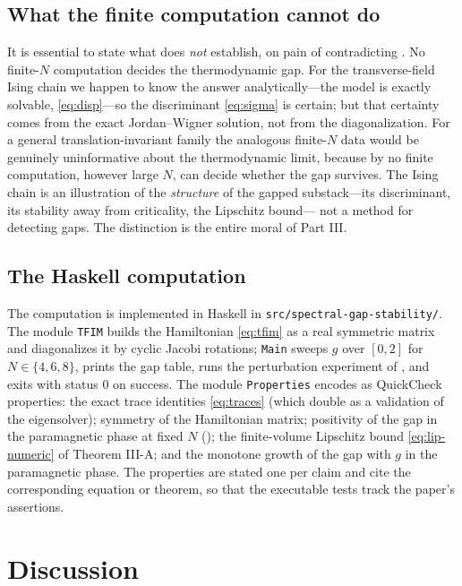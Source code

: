 \documentclass[12pt]{article}
\theoremstyle{plain}
\theoremstyle{definition}
\theoremstyle{remark}
\begin{document}
\subsection{What the finite computation cannot do}
\label{sec:numerics-cannot}

It is essential to state what  does \emph{not} establish, on pain of
contradicting . No finite-$N$ computation decides the thermodynamic gap.
For the transverse-field Ising chain we happen to know the answer analytically---the
model is exactly solvable, \eqref{eq:disp}---so the discriminant \eqref{eq:sigma} is
certain; but that certainty comes from the exact Jordan--Wigner solution, not from the
diagonalization. For a general translation-invariant family the analogous finite-$N$
data would be genuinely uninformative about the thermodynamic limit, because by
 no finite computation, however large $N$, can decide whether the gap
survives. The Ising chain is an illustration of the \emph{structure} of the gapped
substack---its discriminant, its stability away from criticality, the Lipschitz bound---%
not a method for detecting gaps. The distinction is the entire moral of Part III\@.

\subsection{The Haskell computation}
\label{sec:numerics-code}

The computation is implemented in Haskell in \texttt{src/spectral-gap-stability/}. The
module \texttt{TFIM} builds the Hamiltonian \eqref{eq:tfim} as a real symmetric matrix
and diagonalizes it by cyclic Jacobi rotations; \texttt{Main} sweeps $g$ over $[0,2]$
for $N\in\{4,6,8\}$, prints the gap table, runs the perturbation experiment of
, and exits with status $0$ on success. The module
\texttt{Properties} encodes as QuickCheck properties: the exact trace identities
\eqref{eq:traces} (which double as a validation of the eigensolver); symmetry of the
Hamiltonian matrix; positivity of the gap in the paramagnetic phase at fixed $N$
(); the finite-volume Lipschitz bound \eqref{eq:lip-numeric} of
Theorem III-A; and the monotone growth of the gap with $g$ in the paramagnetic phase.
The properties are stated one per claim and cite the corresponding equation or theorem,
so that the executable tests track the paper's assertions.

\section{Discussion}
\label{sec:discussion}
\end{document}
